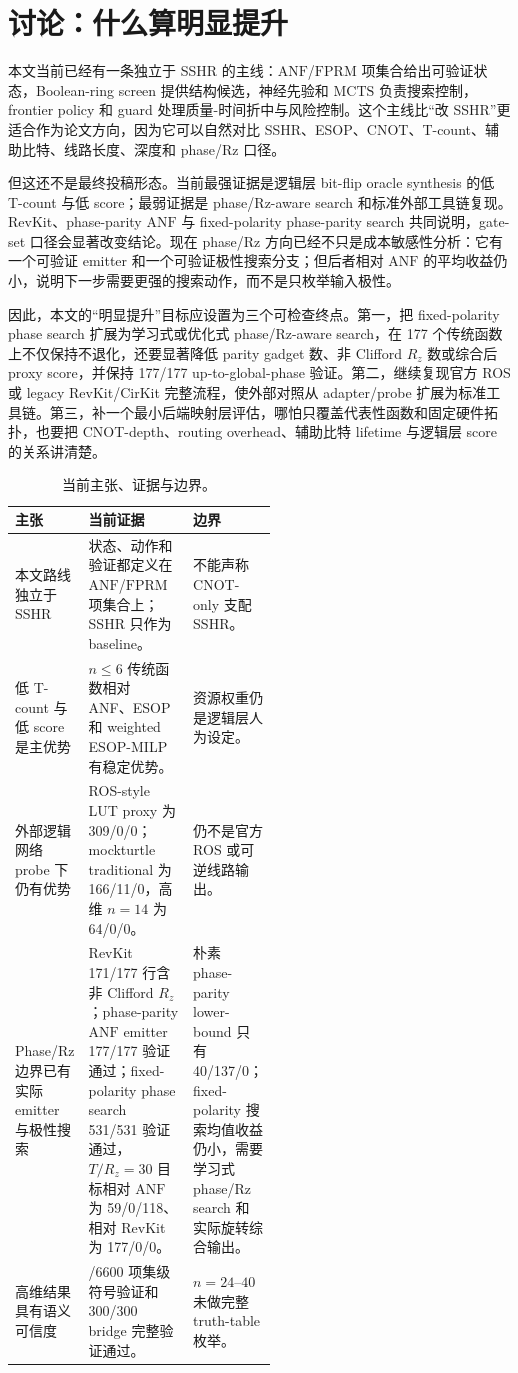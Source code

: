 \documentclass[UTF8,fontset=macnew,11pt]{ctexart}
\newcommand{\anf}{\ensuremath{\mathrm{ANF}}}
\newcommand{\fprm}{\ensuremath{\mathrm{FPRM}}}
\newcommand{\mcts}{\ensuremath{\mathrm{MCTS}}}
\newcommand{\rz}{\ensuremath{R_z}}
\newcommand{\ttable}{truth-table}
\begin{document}
\section{讨论：什么算明显提升}

本文当前已经有一条独立于 SSHR 的主线：\anf{}/\fprm{} 项集合给出可验证状态，Boolean-ring screen 提供结构候选，神经先验和 \mcts{} 负责搜索控制，frontier policy 和 guard 处理质量-时间折中与风险控制。这个主线比“改 SSHR”更适合作为论文方向，因为它可以自然对比 SSHR、ESOP、CNOT、T-count、辅助比特、线路长度、深度和 phase/Rz 口径。

但这还不是最终投稿形态。当前最强证据是逻辑层 bit-flip oracle synthesis 的低 T-count 与低 score；最弱证据是 phase/Rz-aware search 和标准外部工具链复现。RevKit、phase-parity \anf{} 与 fixed-polarity phase-parity search 共同说明，gate-set 口径会显著改变结论。现在 phase/Rz 方向已经不只是成本敏感性分析：它有一个可验证 emitter 和一个可验证极性搜索分支；但后者相对 \anf{} 的平均收益仍小，说明下一步需要更强的搜索动作，而不是只枚举输入极性。

因此，本文的“明显提升”目标应设置为三个可检查终点。第一，把 fixed-polarity phase search 扩展为学习式或优化式 phase/Rz-aware search，在 177 个传统函数上不仅保持不退化，还要显著降低 parity gadget 数、非 Clifford \rz{} 数或综合后 proxy score，并保持 177/177 up-to-global-phase 验证。第二，继续复现官方 ROS 或 legacy RevKit/CirKit 完整流程，使外部对照从 adapter/probe 扩展为标准工具链。第三，补一个最小后端映射层评估，哪怕只覆盖代表性函数和固定硬件拓扑，也要把 CNOT-depth、routing overhead、辅助比特 lifetime 与逻辑层 score 的关系讲清楚。

\begin{table}[H]
\centering
\small
\caption{当前主张、证据与边界。}
\label{tab:evidence-map}
\begin{tabularx}{\linewidth}{>{\raggedright\arraybackslash}p{0.27\linewidth}>{\raggedright\arraybackslash}X>{\raggedright\arraybackslash}p{0.25\linewidth}}
\toprule
主张 & 当前证据 & 边界 \\
\midrule
本文路线独立于 SSHR & 状态、动作和验证都定义在 \anf{}/\fprm{} 项集合上；SSHR 只作为 baseline。 & 不能声称 CNOT-only 支配 SSHR。 \\
低 T-count 与低 score 是主优势 & $n\leq6$ 传统函数相对 ANF、ESOP 和 weighted ESOP-MILP 有稳定优势。 & 资源权重仍是逻辑层人为设定。 \\
外部逻辑网络 probe 下仍有优势 & ROS-style LUT proxy 为 309/0/0；mockturtle traditional 为 166/11/0，高维 $n=14$ 为 64/0/0。 & 仍不是官方 ROS 或可逆线路输出。 \\
Phase/Rz 边界已有实际 emitter 与极性搜索 & RevKit 171/177 行含非 Clifford \rz{}；phase-parity \anf{} emitter 177/177 验证通过；fixed-polarity phase search 531/531 验证通过，$T/R_z=30$ 目标相对 \anf{} 为 59/0/118、相对 RevKit 为 177/0/0。 & 朴素 phase-parity lower-bound 只有 40/137/0；fixed-polarity 搜索均值收益仍小，需要学习式 phase/Rz search 和实际旋转综合输出。 \\
高维结果具有语义可信度 & 6600/6600 项集级符号验证和 300/300 bridge 完整验证通过。 & $n=24$--$40$ 未做完整 \ttable{} 枚举。 \\
\bottomrule
\end{tabularx}
\end{table}
\end{document}
